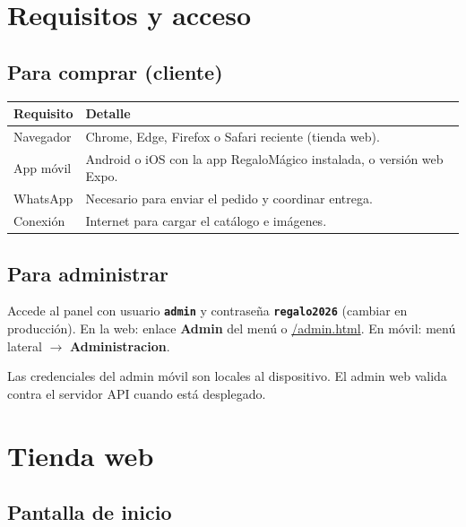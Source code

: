 \documentclass[11pt,a4paper,oneside,openany]{scrbook}
\newcommand{\app}{RegaloM\'agico}
\newcommand{\ui}[1]{\textbf{\textcolor{rmRose}{#1}}}
\newcommand{\kbd}[1]{\texttt{\textbf{#1}}}
\begin{document}
\tableofcontents
\listoffigures
\clearpage

\mainmatter

\chapter{Requisitos y acceso}

\section{Para comprar (cliente)}

\begin{tabularx}{\textwidth}{@{}lX@{}}
\toprule
\textbf{Requisito} & \textbf{Detalle} \\
\midrule
Navegador & Chrome, Edge, Firefox o Safari reciente (tienda web). \\
App m\'ovil & Android o iOS con la app \app{} instalada, o versi\'on web Expo. \\
WhatsApp & Necesario para enviar el pedido y coordinar entrega. \\
Conexi\'on & Internet para cargar el cat\'alogo e im\'agenes. \\
\bottomrule
\end{tabularx}

\section{Para administrar}

Accede al panel con usuario \kbd{admin} y contrase\~na \kbd{regalo2026} (cambiar en producci\'on). En la web: enlace \ui{Admin} del men\'u o \url{/admin.html}. En m\'ovil: men\'u lateral $\rightarrow$ \ui{Administracion}.

\begin{warnbox}
  Las credenciales del admin m\'ovil son locales al dispositivo. El admin web valida contra el servidor API cuando est\'a desplegado.
\end{warnbox}

\chapter{Tienda web}

\section{Pantalla de inicio}
\end{document}
